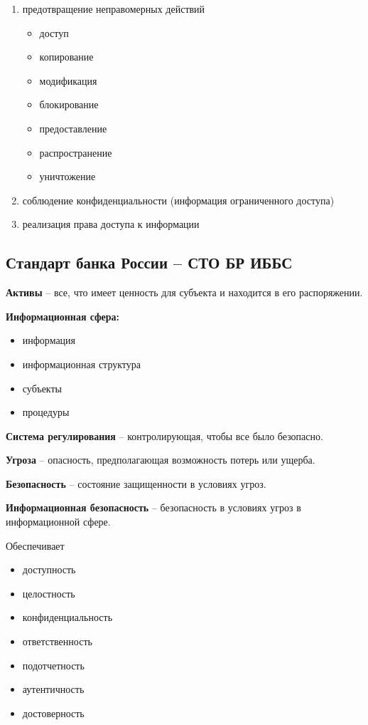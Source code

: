 \begin{enumerate}
    \item предотвращение неправомерных действий

        \begin{itemize}
            \item доступ
            \item копирование
            \item модификация
            \item блокирование
            \item предоставление
            \item распространение
            \item уничтожение
        \end{itemize}

    \item соблюдение конфиденциальности (информация ограниченного доступа)
    \item реализация права доступа к информации
\end{enumerate}

\subsection{Стандарт банка России -- СТО БР ИББС}

\textbf{Активы} -- все, что имеет ценность для субъекта и находится в его распоряжении.

\textbf{Информационная сфера:}

\begin{itemize}
    \item информация
    \item информационная структура
    \item субъекты
    \item процедуры
\end{itemize}

\textbf{Система регулирования} -- контролирующая, чтобы все было безопасно.

\textbf{Угроза} -- опасность, предполагающая возможность потерь или ущерба.

\textbf{Безопасность} -- состояние защищенности в условиях угроз.

\textbf{Информационная безопасность} -- безопасность в условиях угроз в информационной сфере.

Обеспечивает

\begin{itemize}
    \item доступность
    \item целостность
    \item конфиденциальность
    \item ответственность
    \item подотчетность
    \item аутентичность
    \item достоверность
\end{itemize}

